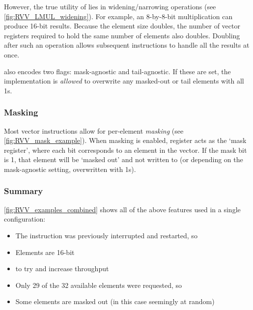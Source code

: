 
However, the true utility of  lies in widening/narrowing operations (see \cref{fig:RVV_LMUL_widening}).
For example, an 8-by-8-bit multiplication can produce 16-bit results.
Because the element size doubles, the number of vector registers required to hold the same number of elements also doubles.
Doubling  after such an operation allows subsequent instructions to handle all the results at once.

 also encodes two flags: mask-agnostic and tail-agnostic.
If these are set, the implementation is \emph{allowed} to overwrite any masked-out or tail elements with all 1s.

\pagebreak
{}
\subsubsection{Masking}
Most vector instructions allow for per-element \emph{masking} (see \cref{fig:RVV_mask_example}).
When masking is enabled, register  acts as the `mask register', where each bit corresponds to an element in the vector.
If the mask bit is 1, that element will be `masked out' and not written to (or depending on the mask-agnostic setting, overwritten with 1s).


\subsubsection{Summary}
\cref{fig:RVV_examples_combined} shows all of the above features used in a single configuration:
\begin{itemize}
    \item The instruction was previously interrupted and restarted, so 
    \item Elements are 16-bit
    \item {} to try and increase throughput
    \item Only 29 of the 32 available elements were requested, so 
    \item Some elements are masked out (in this case seemingly at random)
\end{itemize}

